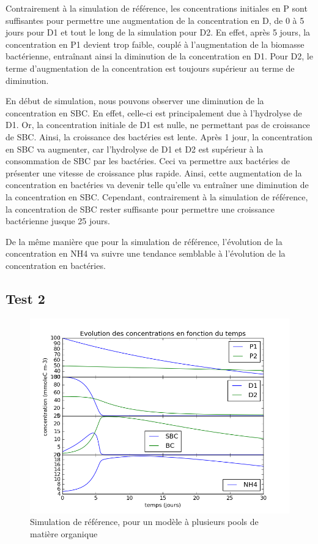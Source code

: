 \par{
Contrairement \`a la simulation de r\'ef\'erence, les concentrations initiales en P sont suffisantes pour permettre une augmentation de la concentration en D, de 0 \`a 5 jours pour D1 et tout le long de la simulation pour D2. En effet, apr\`es 5 jours, la concentration en P1 devient trop faible, coupl\'e \`a l'augmentation de la biomasse bact\'erienne, entra\^inant ainsi la diminution de la concentration en D1. Pour D2, le terme d'augmentation de la concentration est toujours sup\'erieur au terme de diminution.
}
\par{
En d\'ebut de simulation, nous pouvons observer une diminution de la concentration en SBC. En effet, celle-ci est principalement due \`a l'hydrolyse de D1. Or, la concentration initiale de D1 est nulle, ne permettant pas de croissance de SBC. Ainsi, la croissance des bact\'eries est lente. Apr\`es 1 jour, la concentration en SBC va augmenter, car l'hydrolyse de D1 et D2 est sup\'erieur \`a la consommation de SBC par les bact\'eries. Ceci va permettre aux bact\'eries de pr\'esenter une vitesse de croissance plus rapide. Ainsi, cette augmentation de la concentration en bact\'eries va devenir telle qu'elle va entra\^iner une diminution de la concentration en SBC. Cependant, contrairement \`a la simulation de r\'ef\'erence, la concentration de SBC rester suffisante pour permettre une croissance bact\'erienne jusque 25 jours.
}
\par{
De la m\^eme mani\`ere que pour la simulation de r\'ef\'erence, l'\'evolution de la concentration en NH4 va suivre une tendance semblable \`a l'\'evolution de la concentration en bact\'eries.
}

\subsection{Test 2}

\begin{figure}[h!]
  \includegraphics[width=\textwidth]{partie2/Test2.png}
  \caption{Simulation de r\'ef\'erence, pour un mod\`ele \`a plusieurs pools de mati\`ere organique
  }
  \label{fig:partie2test2}
\end{figure}

